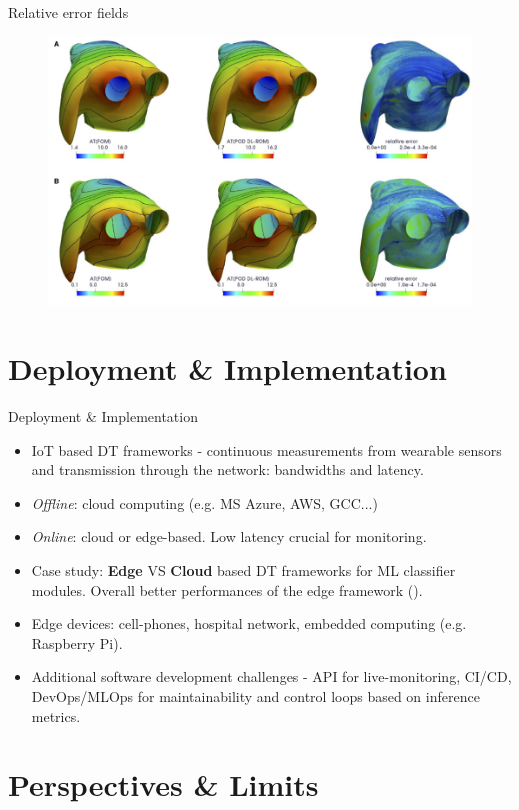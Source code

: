 \documentclass{beamer}
\begin{document}
\begin{frame}{Relative error fields}
  
  \begin{figure}
      \centering
      \includegraphics[width=0.7\linewidth]{images/err-fields.png}
      \caption{\textcite{Fresca2021}}
  \end{figure}

\end{frame}

\section{Deployment \& Implementation}

\begin{frame}{Deployment \& Implementation}
  \begin{itemize}
    \item IoT based DT frameworks - continuous measurements from wearable sensors and transmission through the network: bandwidths and latency.
    \item \textit{Offline}: cloud computing (e.g. MS Azure, AWS, GCC...)
    \item \textit{Online}: cloud or edge-based. Low latency crucial for monitoring.
    \item Case study: \textbf{Edge} VS \textbf{Cloud} based DT frameworks for ML classifier modules. Overall better performances of the edge framework (\textcite{burak2023}).
    \item Edge devices: cell-phones, hospital network, embedded computing (e.g. Raspberry Pi).
    \item Additional software development challenges - API for live-monitoring, CI/CD, DevOps/MLOps for maintainability and control loops based on inference metrics.
  \end{itemize}
\end{frame}

\section{Perspectives \& Limits}
\end{document}
